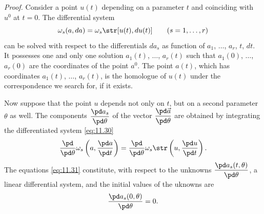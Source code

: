 \somespace

\emph{Proof.} Consider a point $u(t)$ depending on a parameter $t$ and coinciding with $u^{0}$ at $t=0$. The differential system
\begin{equation}
  \label{eq:11.30}
  \omega_{s}(a,da)=\omega_{s}\str[u(t),du(t)]\qquad(s=1,\dots,r)
\end{equation}
can be solved with respect to the differentials $da_{s}$ as function of $a_{1}$, $\dots$, $a_{r}$, $t$, $dt$. It possesses one and only one solution $a_{1}(t)$, $\dots$, $a_{r}(t)$ such that $a_{1}(0)$, $\dots$, $a_{r}(0)$ are the coordinates of the point $a^{0}$. The point $a(t)$, which has coordinates $a_{1}(t)$, $\dots$, $a_{r}(t)$, is the homologue of $u(t)$ under the correspondence we search for, if it exists.

Now suppose that the point $u$ depends not only on $t$, but on a second parameter $\theta$ as well. The components $\dfrac{\pd a_{s}}{\pd \theta}$ of the vector $\dfrac{\pd \vec{a}}{\pd \theta}$ are obtained by integrating the differentiated system \eqref{eq:11.30}
\begin{equation}
  \label{eq:11.31}
  \frac{\pd}{\pd\theta}\omega_{s}\left(a,\frac{\pd a}{\pd t}\right)=\frac{\pd}{\pd\theta}\omega_{s}\str\left(u,\frac{\pd u}{\pd t}\right).
\end{equation}
The equations \eqref{eq:11.31} constitute, with respect to the unknowns $\dfrac{\pd a_{s}(t,\theta)}{\pd\theta}$, a linear differential system, and the initial values of the uknowns are
\[
\frac{\pd a_{s}(0,\theta)}{\pd \theta}=0.
\]

